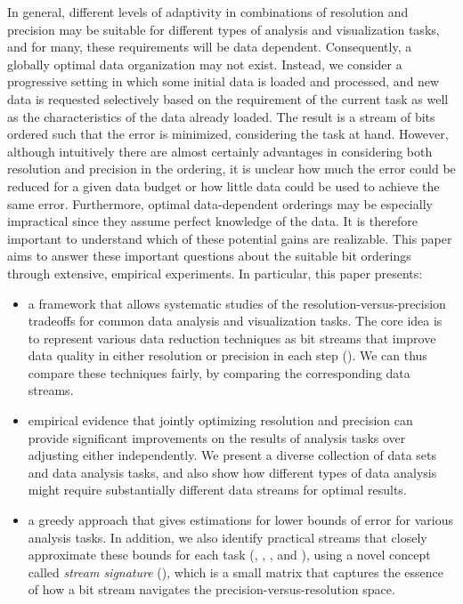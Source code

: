 In general, different levels of adaptivity in combinations of resolution and precision may be
suitable for different types of analysis and visualization tasks, and for many, these requirements
will be data dependent. Consequently, a globally optimal data organization may not exist. Instead,
we consider a progressive setting in which some initial data is loaded and processed, and new data
is requested selectively based on the requirement of the current task as well as the characteristics
of the data already loaded. The result is a stream of bits ordered such that the error is minimized,
considering the task at hand. However, although intuitively there are almost certainly advantages in
considering both resolution and precision in the ordering, it is unclear how much the error could be
reduced for a given data budget or how little data could be used to achieve the same error.
Furthermore, optimal data-dependent orderings may be especially impractical since they assume
perfect knowledge of the data. It is therefore important to understand which of these potential
gains are realizable. This paper aims to answer these important questions about the suitable bit
orderings through extensive, empirical experiments. In particular, this paper presents:

\begin{itemize}\dense
%
\item a framework that allows systematic studies of the resolution-versus-precision tradeoffs for
common data analysis and visualization tasks. The core idea is to represent various data reduction
techniques as bit streams that improve data quality in either resolution or precision in each step
(). We can thus compare these techniques fairly, by comparing the
corresponding data streams.
%  
\item empirical evidence that jointly optimizing resolution and precision can provide significant
improvements on the results of analysis tasks over adjusting either independently. 
We present a diverse collection of data sets and data analysis tasks, and also show how
different types of data analysis might require substantially different data streams for optimal
results.
%
\item a greedy approach that gives estimations for lower bounds of error for various analysis tasks.
In addition, we also identify practical streams that closely approximate these bounds for each task
(, , , and
), using a novel concept called \emph{stream signature}
(), which is a small matrix that captures the essence of how a bit stream
navigates the precision-versus-resolution space.
\end{itemize}

